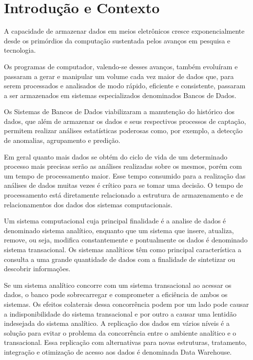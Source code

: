 \chapter{Introdução e Contexto}

A capacidade de armazenar dados em meios eletrônicos cresce exponencialmente desde os primórdios da computação sustentada pelos avanços em pesquisa e tecnologia. 

\par
Os programas de computador, valendo-se desses avanços, também evoluíram e passaram a gerar e manipular um volume cada vez maior de dados que, para serem processados e analisados de modo rápido, eficiente e consistente, passaram a ser armazenados em sistemas especializados denominados Bancos de Dados. 

\par
Os Sistemas de Bancos de Dados viabilizaram a manutenção do histórico dos dados, que além de armazenar os dados e seus respectivos processos de captação, permitem realizar análises estatísticas poderosas como, por exemplo, a detecção de anomalias, agrupamento e predição.

\par
Em geral quanto mais dados se obtém do ciclo de vida de um determinado processo mais precisas serão as análises realizadas sobre os mesmos, porém com um tempo de processamento maior. Esse tempo consumido para a realização das análises de dados muitas vezes é crítico para se tomar uma decisão. O tempo de processamento está diretamente relacionado a estrutura de armazenamento e de relacionamentos dos dados dos sistemas computacionais.

\par 
Um sistema computacional cuja principal finalidade é a analise de dados é denominado sistema analítico, enquanto que um sistema que insere, atualiza, remove, ou seja, modifica constantemente e pontualmente os dados é denominado sistema transacional. Os sistemas analíticos têm como principal característica a consulta a uma grande quantidade de dados com a finalidade de sintetizar ou descobrir informações. 

\par
Se um sistema analítico concorre com um sistema transacional ao acessar os dados, o banco pode sobrecarregar e comprometer a eficiência de ambos os sistemas. Os efeitos colaterais dessa concorrência podem por um lado pode causar a indisponibilidade do sistema transacional e por outro a causar uma lentidão indesejada do sistema analítico. A replicação dos dados em vários níveis é a solução para evitar o problema da concorrência entre o ambiente analítico e o transacional. Essa replicação com alternativas para novas estruturas, tratamento, integração e otimização de acesso aos dados é denominada Data Warehouse.

